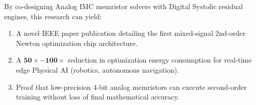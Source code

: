 \begin{takeawaybox}
By co-designing Analog IMC memristor solvers with Digital Systolic residual engines, this research can yield:
\begin{enumerate}[leftmargin=*]
    \item A novel IEEE paper publication detailing the first mixed-signal 2nd-order Newton optimization chip architecture.
    \item A $\mathbf{50\times - 100\times}$ reduction in optimization energy consumption for real-time edge Physical AI (robotics, autonomous navigation).
    \item Proof that low-precision 4-bit analog memristors can execute second-order training without loss of final mathematical accuracy.
\end{enumerate}
\end{takeawaybox}
